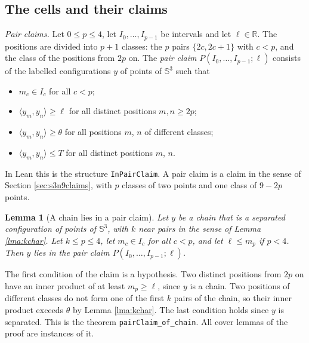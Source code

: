 \documentclass[reqno,a4paper,11pt]{amsart}
\numberwithin{equation}{section}
\newtheorem{lemma}[theorem]{Lemma}
\def\R{{\mathbb R}}
\newcommand{\Sph}{\mathbb{S}}
\newcommand{\lean}[1]{\texttt{#1}}
\begin{document}
\subsection{The cells and their claims}\label{sec:cells}

\emph{Pair claims.} Let $0 \leq p \leq 4$, let $I_0, \dots, I_{p-1}$ be intervals and let $\ell \in \R$. The positions are divided into $p + 1$ classes: the $p$ pairs $\{2c, 2c+1\}$ with $c < p$, and the class of the positions from $2p$ on. The \emph{pair claim} $P(I_0, \dots, I_{p-1}; \ell)$ consists of the labelled configurations $y$ of points of $\Sph^3$ such that
\begin{itemize}
    \item $m_c \in I_c$ for all $c < p$;
    \item $\langle y_m, y_n \rangle \geq \ell$ for all distinct positions $m, n \geq 2p$;
    \item $\langle y_m, y_n \rangle \geq \theta$ for all positions $m$, $n$ of different classes;
    \item $\langle y_m, y_n \rangle \leq T$ for all distinct positions $m$, $n$.
\end{itemize}
In Lean this is the structure \lean{InPairClaim}. A pair claim is a claim in the sense of Section \ref{sec:s3n9claims}, with $p$ classes of two points and one class of $9 - 2p$ points.

\begin{lemma}[A chain lies in a pair claim]\label{lma:pairclaim}
Let $y$ be a chain that is a separated configuration of points of $\Sph^3$, with $k$ near pairs in the sense of Lemma \ref{lma:kchar}. Let $k \leq p \leq 4$, let $m_c \in I_c$ for all $c < p$, and let $\ell \leq m_p$ if $p < 4$. Then $y$ lies in the pair claim $P(I_0, \dots, I_{p-1}; \ell)$.
\end{lemma}

The first condition of the claim is a hypothesis. Two distinct positions from $2p$ on have an inner product of at least $m_p \geq \ell$, since $y$ is a chain. Two positions of different classes do not form one of the first $k$ pairs of the chain, so their inner product exceeds $\theta$ by Lemma \ref{lma:kchar}. The last condition holds since $y$ is separated. This is the theorem \lean{pairClaim\_of\_chain}. All cover lemmas of the proof are instances of it.
\end{document}
